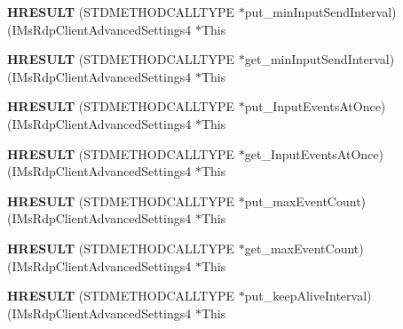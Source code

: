 \begin{DoxyCompactItemize}
{\bfseries H\+R\+E\+S\+U\+LT} (S\+T\+D\+M\+E\+T\+H\+O\+D\+C\+A\+L\+L\+T\+Y\+PE $\ast$put\+\_\+min\+Input\+Send\+Interval)(I\+Ms\+Rdp\+Client\+Advanced\+Settings4 $\ast$This
\item 
\mbox{\label{struct_i_ms_rdp_client_advanced_settings4_vtbl_aabcac214aceada6cd5f818befd15a90c}} 
{\bfseries H\+R\+E\+S\+U\+LT} (S\+T\+D\+M\+E\+T\+H\+O\+D\+C\+A\+L\+L\+T\+Y\+PE $\ast$get\+\_\+min\+Input\+Send\+Interval)(I\+Ms\+Rdp\+Client\+Advanced\+Settings4 $\ast$This
\item 
\mbox{\label{struct_i_ms_rdp_client_advanced_settings4_vtbl_a3a45a9409a850f2df068971b5ccf5e60}} 
{\bfseries H\+R\+E\+S\+U\+LT} (S\+T\+D\+M\+E\+T\+H\+O\+D\+C\+A\+L\+L\+T\+Y\+PE $\ast$put\+\_\+\+Input\+Events\+At\+Once)(I\+Ms\+Rdp\+Client\+Advanced\+Settings4 $\ast$This
\item 
\mbox{\label{struct_i_ms_rdp_client_advanced_settings4_vtbl_a1aaa1aad774a194c851dd3cac7b38408}} 
{\bfseries H\+R\+E\+S\+U\+LT} (S\+T\+D\+M\+E\+T\+H\+O\+D\+C\+A\+L\+L\+T\+Y\+PE $\ast$get\+\_\+\+Input\+Events\+At\+Once)(I\+Ms\+Rdp\+Client\+Advanced\+Settings4 $\ast$This
\item 
\mbox{\label{struct_i_ms_rdp_client_advanced_settings4_vtbl_a12e633f6c378054729a602518bfbf6e9}} 
{\bfseries H\+R\+E\+S\+U\+LT} (S\+T\+D\+M\+E\+T\+H\+O\+D\+C\+A\+L\+L\+T\+Y\+PE $\ast$put\+\_\+max\+Event\+Count)(I\+Ms\+Rdp\+Client\+Advanced\+Settings4 $\ast$This
\item 
\mbox{\label{struct_i_ms_rdp_client_advanced_settings4_vtbl_a054034e16437dce2f26dc5c0b756560e}} 
{\bfseries H\+R\+E\+S\+U\+LT} (S\+T\+D\+M\+E\+T\+H\+O\+D\+C\+A\+L\+L\+T\+Y\+PE $\ast$get\+\_\+max\+Event\+Count)(I\+Ms\+Rdp\+Client\+Advanced\+Settings4 $\ast$This
\item 
\mbox{\label{struct_i_ms_rdp_client_advanced_settings4_vtbl_addf7ab7f4a018982390e8b289b9bb917}} 
{\bfseries H\+R\+E\+S\+U\+LT} (S\+T\+D\+M\+E\+T\+H\+O\+D\+C\+A\+L\+L\+T\+Y\+PE $\ast$put\+\_\+keep\+Alive\+Interval)(I\+Ms\+Rdp\+Client\+Advanced\+Settings4 $\ast$This

\end{DoxyCompactItemize}
